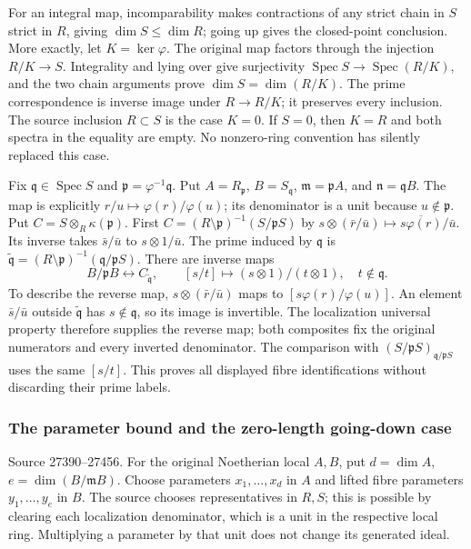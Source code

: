 For an integral map, incomparability makes contractions of any strict chain in \(S\) strict in \(R\), giving \(\dim S\leq\dim R\); going up gives the closed-point conclusion. More exactly, let \(K=\ker\varphi\). The original map factors through the injection \(R/K\to S\). Integrality and lying over give surjectivity \(\operatorname{Spec}S\to\operatorname{Spec}(R/K)\), and the two chain arguments prove \(\dim S=\dim(R/K)\). The prime correspondence is inverse image under \(R\to R/K\); it preserves every inclusion. The source inclusion \(R\subset S\) is the case \(K=0\). If \(S=0\), then \(K=R\) and both spectra in the equality are empty. No nonzero-ring convention has silently replaced this case.

Fix \(\mathfrak q\in\operatorname{Spec}S\) and \(\mathfrak p=\varphi^{-1}\mathfrak q\). Put \(A=R_{\mathfrak p}\), \(B=S_{\mathfrak q}\), \(\mathfrak m=\mathfrak pA\), and \(\mathfrak n=\mathfrak qB\). The map is explicitly \(r/u\mapsto\varphi(r)/\varphi(u)\); its denominator is a unit because \(u\notin\mathfrak p\). Put \(C=S\otimes_R\kappa(\mathfrak p)\). First \(C=(R\setminus\mathfrak p)^{-1}(S/\mathfrak pS)\) by \(s\otimes(\bar r/\bar u)\mapsto\overline{s\varphi(r)}/\bar u\). Its inverse takes \(\bar s/\bar u\) to \(s\otimes1/\bar u\). The prime induced by \(\mathfrak q\) is \(\tilde{\mathfrak q}=(R\setminus\mathfrak p)^{-1}
(\mathfrak q/\mathfrak pS)\). There are inverse maps \[
 B/\mathfrak pB\longleftrightarrow C_{\tilde{\mathfrak q}},
 \qquad
 [s/t]\longmapsto(s\otimes1)/(t\otimes1),\quad t\notin\mathfrak q.
\] To describe the reverse map, \(s\otimes(\bar r/\bar u)\) maps to \([s\varphi(r)/\varphi(u)]\). An element \(\bar s/\bar u\) outside \(\tilde{\mathfrak q}\) has \(s\notin\mathfrak q\), so its image is invertible. The localization universal property therefore supplies the reverse map; both composites fix the original numerators and every inverted denominator. The comparison with \((S/\mathfrak pS)_{\mathfrak q/\mathfrak pS}\) uses the same \([s/t]\). This proves all displayed fibre identifications without discarding their prime labels.

\subsubsection{The parameter bound and the zero-length going-down case}\label{algebra-proof-024-the-parameter-bound-and-the-zero-length-going-down-case}

Source 27390--27456. For the original Noetherian local \(A,B\), put \(d=\dim A\), \(e=\dim(B/\mathfrak mB)\). Choose parameters \(x_1,\ldots,x_d\) in \(A\) and lifted fibre parameters \(y_1,\ldots,y_e\) in \(B\). The source chooses representatives in \(R,S\); this is possible by clearing each localization denominator, which is a unit in the respective local ring. Multiplying a parameter by that unit does not change its generated ideal.


